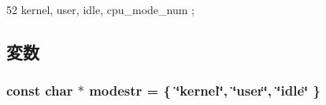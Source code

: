 \begin{DoxyCode}
52 { kernel, user, idle, cpu_mode_num };
\end{DoxyCode}


\subsection{変数}
\hypertarget{namespaceAlphaISA_1_1Kernel_a779f5671616442e377e5078bf4c9bd82}{
\subsubsection[{modestr}]{\setlength{\rightskip}{0pt plus 5cm}const char $\ast$ {\bf modestr} = \{ \char`\"{}kernel\char`\"{}, \char`\"{}user\char`\"{}, \char`\"{}idle\char`\"{} \}}}
\label{namespaceAlphaISA_1_1Kernel_a779f5671616442e377e5078bf4c9bd82}
